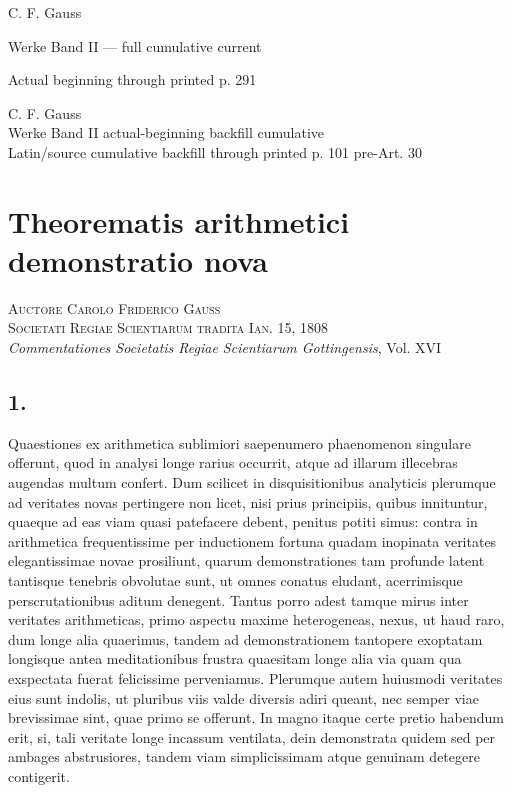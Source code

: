 \documentclass[12pt]{article}
\begin{document}
\begin{center}
{\Large C. F. Gauss}\par
{\large Werke Band II — full cumulative current}\par
{\large Actual beginning through printed p. 291}
\end{center}



\begin{center}
{\Large C. F. Gauss}\\[3pt]
{\large Werke Band II actual-beginning backfill cumulative}\\[3pt]
{\large Latin/source cumulative backfill through printed p. 101 pre-Art. 30}
\end{center}


\section*{Theorematis arithmetici demonstratio nova}

\begin{center}
\textsc{Auctore Carolo Friderico Gauss}\\
\textsc{Societati Regiae Scientiarum tradita Ian. 15, 1808}\\[3pt]
\emph{Commentationes Societatis Regiae Scientiarum Gottingensis}, Vol. XVI
\end{center}

\subsection*{1.}

Quaestiones ex arithmetica sublimiori saepenumero phaenomenon singulare offerunt, quod in analysi longe rarius occurrit, atque ad illarum illecebras augendas multum confert. Dum scilicet in disquisitionibus analyticis plerumque ad veritates novas pertingere non licet, nisi prius principiis, quibus innituntur, quaeque ad eas viam quasi patefacere debent, penitus potiti simus: contra in arithmetica frequentissime per inductionem fortuna quadam inopinata veritates elegantissimae novae prosiliunt, quarum demonstrationes tam profunde latent tantisque tenebris obvolutae sunt, ut omnes conatus eludant, acerrimisque perscrutationibus aditum denegent. Tantus porro adest tamque mirus inter veritates arithmeticas, primo aspectu maxime heterogeneas, nexus, ut haud raro, dum longe alia quaerimus, tandem ad demonstrationem tantopere exoptatam longisque antea meditationibus frustra quaesitam longe alia via quam qua exspectata fuerat felicissime perveniamus. Plerumque autem huiusmodi veritates eius sunt indolis, ut pluribus viis valde diversis adiri queant, nec semper viae brevissimae sint, quae primo se offerunt. In magno itaque certe pretio habendum erit, si, tali veritate longe incassum ventilata, dein demonstrata quidem sed per ambages abstrusiores, tandem viam simplicissimam atque genuinam detegere contigerit.
\end{document}
